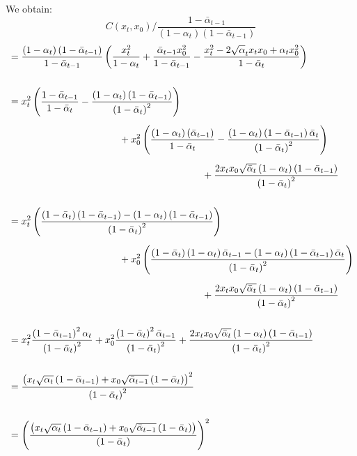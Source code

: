 \documentclass{article}
\numberwithin{equation}{section}
\numberwithin{figure}{section}
\begin{document}
We obtain:
\begin{equation}
  C\left(x_t, x_0\right) / \frac{1 - \bar{\alpha}_{t-1}}{\left(1 - \alpha_t\right)\left(1 - \bar{\alpha}_{t-1}\right)} 
\end{equation}
\begin{align}
    &= \frac{\left(1 - \alpha_t\right)\left(1 - \bar{\alpha}_{t-1}\right)}{1 - \bar{\alpha}_{t-1}} \left( \frac{x_t^2}{1 - \alpha_t} + \frac{\bar{\alpha}_{t-1} x_0^2}{1 - \bar{\alpha}_{t-1}} - \frac{x_t^2 - 2 \sqrt{\alpha}_t x_t x_0 + \alpha_t x_0^2}{1 - \bar{\alpha}_{t}} \right) \\[15pt]
    &= x_t^2 \left(\frac{1 - \bar{\alpha}_{t-1}}{1 - \bar{\alpha}_t} - \frac{\left(1 - \alpha_t\right) \left(1 - \bar{\alpha}_{t-1}\right)}{\left(1 - \bar{\alpha}_t\right)^2}\right) \\[5pt]
    & \hspace{4cm}+ x_0^2 \left( \frac{\left(1 - \alpha_t\right)\left(\bar{\alpha}_{t-1}\right)}{1 - \bar{\alpha}_t} - \frac{\left(1 - \alpha_t\right)\left(1 - \bar{\alpha}_{t-1}\right)\bar{\alpha}_t}{\left(1 - \bar{\alpha}_t\right)^2} \right) \notag \\[5pt]
    & \hspace{7cm} + \frac{2 x_t x_0 \sqrt{\bar{\alpha}_t}\left(1 - \alpha_t\right)\left(1 - \bar{\alpha}_{t-1}\right)}{\left(1 - \bar{\alpha}_{t}\right)^2} \notag \\[15pt]
    &= x_t^2 \left(\frac{ \left( 1 - \bar{\alpha}_t \right) \left( 1 - \bar{\alpha}_{t-1} \right) - \left(1 - \alpha_t\right) \left(1 - \bar{\alpha}_{t-1}\right)}{\left(1 - \bar{\alpha}_t\right)^2}\right) \\[5pt]
    & \hspace{4cm} + x_0^2 \left( \frac{ \left( 1 - \bar{\alpha}_t \right) \left( 1 - \alpha_t \right) \bar{\alpha}_{t-1} - \left(1 - \alpha_t\right)\left(1 - \bar{\alpha}_{t-1}\right)\bar{\alpha}_t}{\left(1 - \bar{\alpha}_t\right)^2} \right) \notag \\[5pt]
    & \hspace{7cm} + \frac{2 x_t x_0 \sqrt{\bar{\alpha}_t}\left(1 - \alpha_t\right)\left(1 - \bar{\alpha}_{t-1}\right)}{\left(1 - \bar{\alpha}_{t}\right)^2} \notag \\[15pt]
    &= x_t^2 \frac{ \left( 1 - \bar{\alpha}_{t-1} \right)^2 \alpha_t }{\left(1 - \bar{\alpha}_t\right)^2} + x_0^2 \frac{\left( 1 - \bar{\alpha}_{t} \right)^2 \bar{\alpha}_{t-1}}{\left(1 - \bar{\alpha}_t\right)^2} + \frac{2 x_t x_0 \sqrt{\bar{\alpha}_t}\left(1 - \alpha_t\right)\left(1 - \bar{\alpha}_{t-1}\right)}{\left(1 - \bar{\alpha}_{t}\right)^2} \\[15pt]
    &= \frac{\left( x_t \sqrt{\alpha_t} \left( 1 - \bar{\alpha}_{t-1} \right) + x_0 \sqrt{\bar{\alpha}_{t-1}} \left( 1 - \bar{\alpha}_t \right) \right)^2}{\left(1 - \bar{\alpha}_{t}\right)^2} \\[15pt]
    &= \left(\frac{\left( x_t \sqrt{\alpha_t} \left( 1 - \bar{\alpha}_{t-1} \right) + x_0 \sqrt{\bar{\alpha}_{t-1}} \left( 1 - \bar{\alpha}_t \right) \right)}{\left(1 - \bar{\alpha}_{t}\right)} \right)^2
\end{align}
\end{document}
